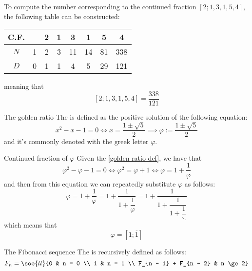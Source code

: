 \documentclass[a4paper, 12pt]{report}
\begin{document}
    \begin{example}
        To compute the number corresponding to the continued fraction $[2;1,3,1,5,4]$, the following table can be constructed:

        \begin{center}
            \begin{tabular}{c|c|c|c|c|c|c|c} 
                C.F. & & 2 & 1 & 3 & 1 & 5 & 4 \\
                \hline
                $N$ & 1 & 2 & 3 & 11 & 14 & 81 & 338 \\
                \hline
                $D$ & 0 & 1 & 1 & 4 & 5 & 29 & 121 \\
                \hline
            \end{tabular}
        \end{center}

        meaning that $$[2;1,3,1,5,4] = \dfrac{338}{121}$$
    \end{example}

    \begin{frameddefn}[label={golden ratio def}]{The golden ratio}
        The  is defined as the positive solution of the following equation: $$x ^2 - x - 1 = 0 \iff x = \dfrac{1 \pm \sqrt{5}}{2} \implies \varphi := \dfrac{1 \pm \sqrt{5}}{2}$$ and it's commonly denoted with the greek letter $\varphi$.
    \end{frameddefn}

    \begin{framedobs}[label={golden ratio cont frac}]{Continued fraction of $\varphi$}
        Given the \cref{golden ratio def}, we have that $$\varphi ^2 - \varphi - 1 = 0 \iff \varphi^2 = \varphi + 1 \iff  \varphi = 1 + \dfrac{1}{\varphi}$$ and then from this equation we can repeatedly substitute $\varphi$ as follows: $$\varphi = 1 + \dfrac{1}{\varphi} = 1 + \dfrac{1}{1 + \dfrac{1}{\varphi}} = 1 + \dfrac{1}{1 + \dfrac{1}{1 + \dfrac{1}{\ddots}}}$$ which means that $$\varphi = [1; \overline 1]$$
    \end{framedobs}

    \begin{frameddefn}[label={fib def}]{The Fibonacci sequence}
        The  is recursively defined as follows: $$F_n = \soe{ll}{0 & n = 0 \\ 1 & n = 1 \\ F_{n - 1} + F_{n - 2} & n \ge 2}$$
    \end{frameddefn}
\end{document}
